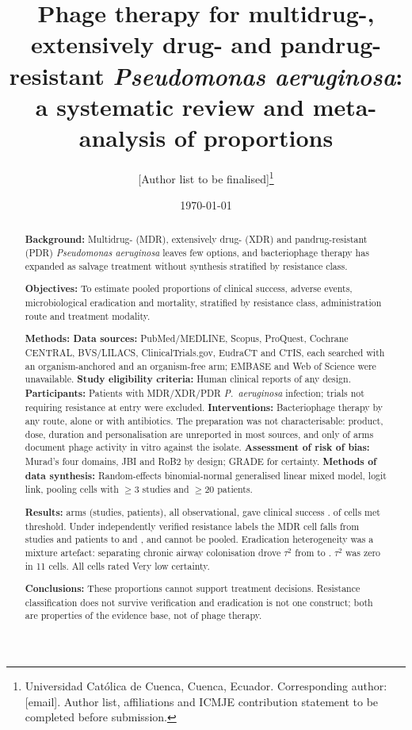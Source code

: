\documentclass[12pt]{article}
\title{Phage therapy for multidrug-, extensively drug- and pandrug-resistant \textit{Pseudomonas aeruginosa}: a systematic review and meta-analysis of proportions}
\author{%
[Author list to be finalised]\thanks{Universidad Cat\'olica de Cuenca, Cuenca, Ecuador. Corresponding author: [email]. Author list, affiliations and ICMJE contribution statement to be completed before submission.}%
}
\date{\today}
\begin{document}
\maketitle
\thispagestyle{empty}

\begin{abstract}
\noindent\singlespacing
\textbf{Background:} Multidrug- (MDR), extensively drug- (XDR) and pandrug-resistant (PDR) \textit{Pseudomonas aeruginosa} leaves few options, and bacteriophage therapy has expanded as salvage treatment without synthesis stratified by resistance class.

\textbf{Objectives:} To estimate pooled proportions of clinical success, adverse events, microbiological eradication and mortality, stratified by resistance class, administration route and treatment modality.

\textbf{Methods: Data sources:} PubMed/MEDLINE, Scopus, ProQuest, Cochrane CENTRAL, BVS/LILACS, ClinicalTrials.gov, EudraCT and CTIS, each searched with an organism-anchored and an organism-free arm; EMBASE and Web of Science were unavailable. \textbf{Study eligibility criteria:} Human clinical reports of any design. \textbf{Participants:} Patients with MDR/XDR/PDR \textit{P.\ aeruginosa} infection; trials not requiring resistance at entry were excluded. \textbf{Interventions:} Bacteriophage therapy by any route, alone or with antibiotics. The preparation was not characterisable: product, dose, duration and personalisation are unreported in most sources, and only \PhageSuscDocumented of \PhageSuscArms arms document phage activity in vitro against the isolate. \textbf{Assessment of risk of bias:} Murad's four domains, JBI and RoB2 by design; GRADE for certainty. \textbf{Methods of data synthesis:} Random-effects binomial-normal generalised linear mixed model, logit link, pooling cells with $\ge$3 studies and $\ge$20 patients.

\textbf{Results:} \PrismaPooledArms arms (\PrismaPooledStudies studies, \PatientsAnalysed patients), all observational, gave clinical success \CsOverallEstCI. \CellsPooled of \CellsTotal cells met threshold. Under independently verified resistance labels the MDR cell falls from \ClassMDRStudiesAll studies and \ClassMDRPatientsAll patients to \ClassMDRStudiesVerified and \ClassMDRPatientsVerified, and cannot be pooled. Eradication heterogeneity was a mixture artefact: separating chronic airway colonisation drove $\tau^2$ from \EradFullTau to \EradOtherTau. $\tau^2$ was zero in 11 cells. All cells rated Very low certainty.

\textbf{Conclusions:} These proportions cannot support treatment decisions. Resistance classification does not survive verification and eradication is not one construct; both are properties of the evidence base, not of phage therapy.
\end{abstract}
\end{document}
